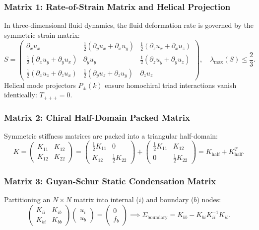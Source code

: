 \documentclass[11pt,a4paper]{article}
\begin{document}
\subsubsection{Matrix 1: Rate-of-Strain Matrix and Helical Projection}
In three-dimensional fluid dynamics, the fluid deformation rate is governed by the symmetric strain matrix:
\begin{equation}
S = \begin{pmatrix} 
\partial_x u_x & \frac{1}{2}(\partial_y u_x + \partial_x u_y) & \frac{1}{2}(\partial_z u_x + \partial_x u_z) \\ 
\frac{1}{2}(\partial_x u_y + \partial_y u_x) & \partial_y u_y & \frac{1}{2}(\partial_z u_y + \partial_y u_z) \\ 
\frac{1}{2}(\partial_x u_z + \partial_z u_x) & \frac{1}{2}(\partial_y u_z + \partial_z u_y) & \partial_z u_z 
\end{pmatrix}, \quad \lambda_{\max}(S) \le \frac{2}{3}.
\end{equation}
Helical mode projectors $P_\pm(k)$ ensure homochiral triad interactions vanish identically: $T_{+++} = 0$.

\subsubsection{Matrix 2: Chiral Half-Domain Packed Matrix}
Symmetric stiffness matrices are packed into a triangular half-domain:
\begin{equation}
K = \begin{pmatrix} K_{11} & K_{12} \\ K_{12} & K_{22} \end{pmatrix} = 
\begin{pmatrix} \frac{1}{2} K_{11} & 0 \\ K_{12} & \frac{1}{2} K_{22} \end{pmatrix} + 
\begin{pmatrix} \frac{1}{2} K_{11} & K_{12} \\ 0 & \frac{1}{2} K_{22} \end{pmatrix} = K_{\mathrm{half}} + K_{\mathrm{half}}^T.
\end{equation}

\subsubsection{Matrix 3: Guyan-Schur Static Condensation Matrix}
Partitioning an $N \times N$ matrix into internal ($i$) and boundary ($b$) nodes:
\begin{equation}
\begin{pmatrix} K_{ii} & K_{ib} \\ K_{bi} & K_{bb} \end{pmatrix} \begin{pmatrix} u_i \\ u_b \end{pmatrix} = \begin{pmatrix} 0 \\ f_b \end{pmatrix} \implies
\Sigma_{\mathrm{boundary}} = K_{bb} - K_{bi} K_{ii}^{-1} K_{ib}.
\end{equation}
\end{document}
